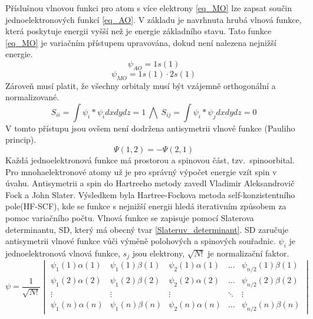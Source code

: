 \documentclass[
  digital, %
  table,   %
  lof,     %
  lot,     %
]{fithesis3}
\begin{document}
Příslušnou vlnovou funkci pro atom s více elektrony \ref{eq_MO} lze zapsat součin jednoelektronových funkcí \ref{eq_AO}.  V základu je navrhnuta hrubá vlnová funkce, která poskytuje energii vyšší než je energie základního stavu. Tato funkce \ref{eq_MO} je variačním přístupem upravována, dokud není nalezena nejnižší energie.  
\begin{equation}
\psi_{AO} = 1s(1)
\label{eq_AO}
\end{equation}
\begin{equation}
\psi_{MO} = 1s(1) \cdot 2s(1)
\label{eq_MO}
\end{equation} 
Zároveň musí platit, že všechny orbitaly musí být vzájemně orthogonální a normalizované.
\begin{equation}
S_{ii} = \int \psi_i * \psi_i dx dy dz = 1 ~ \bigwedge ~ S_{ij} = \int \psi_i * \psi_j dx dy dz = 0
\end{equation}
V tomto přístupu jsou ovšem není dodržena antisymetrii vlnové funkce (Pauliho princip). \cite{warren1986ab}
\begin{equation}
\Psi (1,2) = - \Psi (2,1)
\label{Paulliho_princip}
\end{equation}
 Každá jednoelektronová funkce má prostorou a spinovou část, tzv.~spinoorbital. Pro mnohaelektronové atomy už je pro správný výpočet energie vzít spin v úvahu.  Antisymetrii a spin do Hartreeho metody zavedl Vladimir Aleksandrovič Fock a John Slater. Výsledkem byla Hartree-Fockova metoda self-konzistentního pole(HF-SCF), kde se funkce s nejnižší energii hledá iterativním způsobem za pomoc variačního počtu. Vlnová funkce se zapisuje pomocí Slaterova determinantu, SD, který má obecný tvar \ref{Slateruv_determinant}. SD zaručuje antisymetrii vlnové funkce vůči výměně polohových a spinových souřadnic. $\psi_i$ je jednoelektronová vlnová funkce, $s_j$ jsou elektrony, $\sqrt{N!}$ je normalizační faktor.
\begin{equation}
\psi =  \frac{1}{\sqrt{N!}}\begin{vmatrix}
\psi_1(1)\alpha(1) & \psi_1(1) \beta (1) & \psi_2(1)\alpha(1) & \dots & \psi_{n/2}(1)\beta(1) \\
\psi_1(2)\alpha(2) & \psi_1(2) \beta (2) & \psi_2(2)\alpha(2) & \dots & \psi_{n/2}(2)\beta(2) \\
\vdots             & \vdots              & \vdots             & \ddots & \vdots \\
\psi_1(n)\alpha(n) & \psi_1(n) \beta (n) & \psi_2(n)\alpha(n) & \dots & \psi_{n/2}(n)\beta(n) 
\end{vmatrix}
\label{Slateruv_determinant}
\end{equation}
\end{document}
